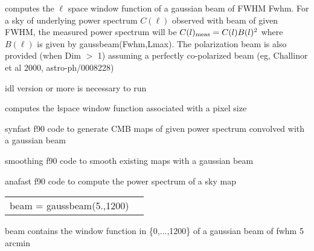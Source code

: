 \begin{codedescription}
{\facname computes the $\ell$ space window function of a gaussian beam of FWHM
Fwhm. For a sky of underlying power spectrum $C(\ell)$ observed with beam of
given FWHM, the measured power spectrum will be $C(\ell)_{\rm meas} = C(\ell)
B(\ell)^2$ where $B(\ell)$ is given by gaussbeam(Fwhm,Lmax). The
polarization beam is also provided (when Dim $>$ 1) assuming a perfectly
co-polarized beam (eg, Challinor et al 2000, astro-ph/0008228)}
\end{codedescription}



\begin{related}
  \begin{sulist}{} %
    \item[idl] version \idlversion or more is necessary to run \facname
    \item[\htmlref{healpixwindow}{idl:healpixwindow}] computes the \l space window function associated with
    a \healpix pixel size
    \item[synfast] f90 code to generate CMB maps of given power spectrum convolved with a gaussian beam
    \item[smoothing] f90 code to smooth existing \healpix maps with a gaussian beam
    \item[anafast] f90 code to compute the power spectrum of a \healpix sky map
  \end{sulist}
\end{related}

\begin{example}
{
\begin{tabular}{ll} %
beam = gaussbeam(5.,1200)
\end{tabular}
}
{
beam contains the window function in \{0,...,1200\} of a gaussian beam of fwhm 5 arcmin}
\end{example}


